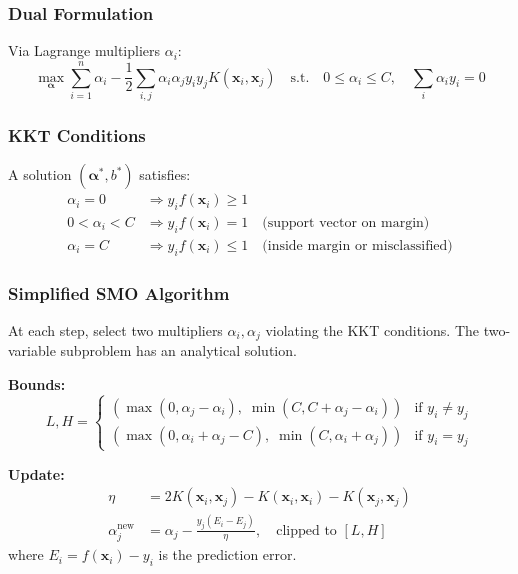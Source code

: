 \documentclass[11pt,a4paper]{article}
\theoremstyle{definition}
\theoremstyle{remark}
\begin{document}
\subsubsection*{Dual Formulation}

Via Lagrange multipliers $\alpha_i$:
\begin{equation}
\max_{\boldsymbol{\alpha}} \sum_{i=1}^n \alpha_i - \frac{1}{2}\sum_{i,j}\alpha_i\alpha_j y_i y_j K(\mathbf{x}_i, \mathbf{x}_j) \quad \text{s.t.} \quad 0 \leq \alpha_i \leq C, \quad \sum_i \alpha_i y_i = 0
\end{equation}

\subsubsection*{KKT Conditions}

A solution $(\boldsymbol{\alpha}^*, b^*)$ satisfies:
\begin{align}
\alpha_i = 0 &\Rightarrow y_i f(\mathbf{x}_i) \geq 1 \\
0 < \alpha_i < C &\Rightarrow y_i f(\mathbf{x}_i) = 1 \quad \text{(support vector on margin)} \\
\alpha_i = C &\Rightarrow y_i f(\mathbf{x}_i) \leq 1 \quad \text{(inside margin or misclassified)}
\end{align}

\subsubsection*{Simplified SMO Algorithm}

At each step, select two multipliers $\alpha_i, \alpha_j$ violating the KKT conditions. The two-variable subproblem has an analytical solution.

\textbf{Bounds:}
\begin{equation}
L, H = \begin{cases}
(\max(0, \alpha_j - \alpha_i),\; \min(C, C + \alpha_j - \alpha_i)) & \text{if } y_i \neq y_j \\
(\max(0, \alpha_i + \alpha_j - C),\; \min(C, \alpha_i + \alpha_j)) & \text{if } y_i = y_j
\end{cases}
\end{equation}

\textbf{Update:}
\begin{align}
\eta &= 2K(\mathbf{x}_i, \mathbf{x}_j) - K(\mathbf{x}_i, \mathbf{x}_i) - K(\mathbf{x}_j, \mathbf{x}_j) \\
\alpha_j^{\text{new}} &= \alpha_j - \frac{y_j(E_i - E_j)}{\eta}, \quad \text{clipped to } [L, H]
\end{align}
where $E_i = f(\mathbf{x}_i) - y_i$ is the prediction error.
\end{document}
